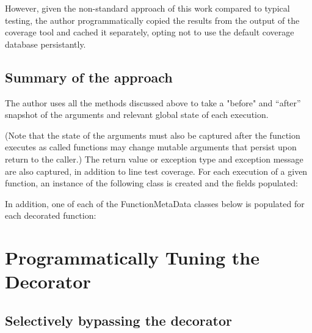 

However, given the non-standard
approach of this work compared to typical testing, the author programmatically
copied the results from the output of the coverage tool and cached it separately, 
opting not to use the default coverage database persistantly.

\subsection{Summary of the approach}\label{sec:approach-internal-5}

The author uses all the methods discussed above to take a "before" and “after” 
snapshot of the arguments and relevant global state of each execution. 

(Note that the state of the arguments must also be captured after the function 
executes as called functions may change mutable arguments that persist upon 
return to the caller.) The return value or exception type and exception message
 are also captured, in addition to line test coverage. 
 For each execution of a given function, an instance of the 
 following class is created and the fields populated:


In addition, one of each of the FunctionMetaData classes below is populated for each decorated function:



\section{Programmatically Tuning the Decorator}\label{sec:decorator tuning}

\subsection{Selectively bypassing the decorator}\label{sec:tuning-1}

